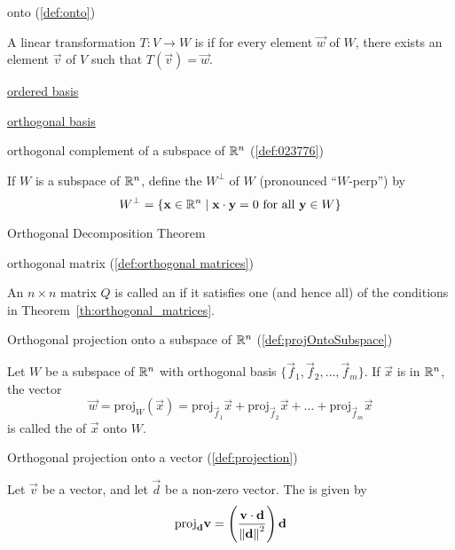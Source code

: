\documentclass{ximera}
\begin{document}
onto (\ref{def:onto})
\begin{expandable}
    A linear transformation $T:V\rightarrow W$ is  if for every element $\vec{w}$ of $W$, there exists an element $\vec{v}$ of $V$ such that $T(\vec{v})=\vec{w}$.
\end{expandable}

\href{https://ximera.osu.edu/oerlinalg/LinearAlgebra/VSP-0060/main}{ordered basis}

\href{https://ximera.osu.edu/oerlinalg/LinearAlgebra/RTH-0010/main}{orthogonal basis}

orthogonal complement of a subspace of $\mathbb{R}^n$ (\ref{def:023776})
\begin{expandable}
    If $W$ is a subspace of $\mathbb{R}^n$, define the  $W^\perp$ of $W$ (pronounced ``$W$-perp'') by
\begin{equation*}
W^\perp = \{\mathbf{x} \in\mathbb{R}^n \mid \mathbf{x} \cdot \mathbf{y} = 0 \mbox{ for all } \mathbf{y} \in W\}
\end{equation*}
\end{expandable}

Orthogonal Decomposition Theorem

orthogonal matrix (\ref{def:orthogonal matrices})
\begin{expandable}
    An $n \times n$ matrix $Q$ is called an  if it satisfies one (and hence all) of the conditions in Theorem~\ref{th:orthogonal_matrices}.
\end{expandable}

Orthogonal projection onto a subspace of $\mathbb{R}^n$ (\ref{def:projOntoSubspace})
\begin{expandable}
    Let $W$ be a subspace of $\mathbb{R}^n$ with orthogonal basis $\{\vec{f}_{1}, \vec{f}_{2}, \dots, \vec{f}_{m}\}$. If $\vec{x}$ is in $\mathbb{R}^n$, the vector
\begin{equation}\label{def:projectontoWeasy}
\vec{w}=\mbox{proj}_W(\vec{x}) = \mbox{proj}_{\vec{f}_1}\vec{x} + \mbox{proj}_{\vec{f}_2}\vec{x} + \dots + \mbox{proj}_{\vec{f}_m}\vec{x}
\end{equation}
is called the  of $\vec{x}$ onto $W$. 
\end{expandable}

Orthogonal projection onto a vector (\ref{def:projection})
\begin{expandable}
    Let $\vec{v}$ be a vector, and let $\vec{d}$ be a non-zero vector.  The  is given by 
$$\mbox{proj}_{\mathbf{d}}\mathbf{v}=\left(\frac{\mathbf{v}\cdot\mathbf{d}}{\left\lVert\mathbf{d}\right\rVert^2}\right)\mathbf{d}$$
\end{expandable}
\end{document}
